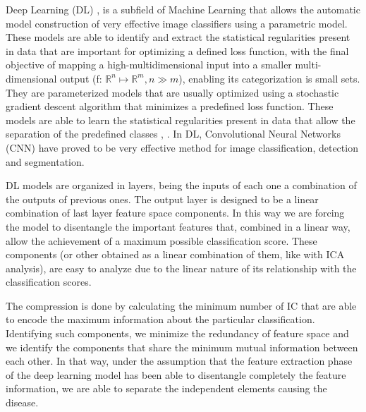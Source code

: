 \documentclass[review]{elsarticle}
\theoremstyle{definition} %
\theoremstyle{remark}
\begin{document}
Deep Learning (DL) \cite{nature-deep-learning}, \cite{Schmidhuber-nn} is a subfield of Machine Learning that allows the automatic model construction of very effective image classifiers using a parametric model. These models are able to identify and extract the statistical regularities present in data that are important for optimizing a defined loss function, with the final objective of mapping a high-multidimensional input into a smaller multi-dimensional output (f: $\mathbb{R}^{n} \mapsto \mathbb{R}^{m}, n \gg m$), enabling its categorization is small sets. They are parameterized models that are usually optimized using a stochastic gradient descent algorithm that minimizes a predefined loss function. These models are able to learn the statistical regularities present in data that allow the separation of the predefined classes \cite{Bengio:2013:RLR:2498740.2498889}, \cite{bengio-2009}. In DL, Convolutional Neural Networks (CNN) have proved to be very effective method for image classification, detection and segmentation. 

	DL models are organized in layers, being the inputs of each one a combination of the outputs of previous ones. The output layer is designed to be a linear combination of last layer feature space components. In this way we are forcing the model to disentangle the important features that, combined in a linear way, allow the achievement of a maximum possible classification score. These components (or other obtained as a linear combination of them, like with ICA analysis), are easy to analyze due to the linear nature of its relationship with the classification scores.

 The compression is done by calculating the minimum number of IC that are able to encode the maximum information about the particular classification. Identifying such components, we minimize the redundancy of feature space and we identify the components that share the minimum mutual information between each other. In that way, under the assumption that the feature extraction phase of the deep learning model has been able to disentangle completely the feature information, we are able to separate the independent elements causing the disease.
\end{document}
